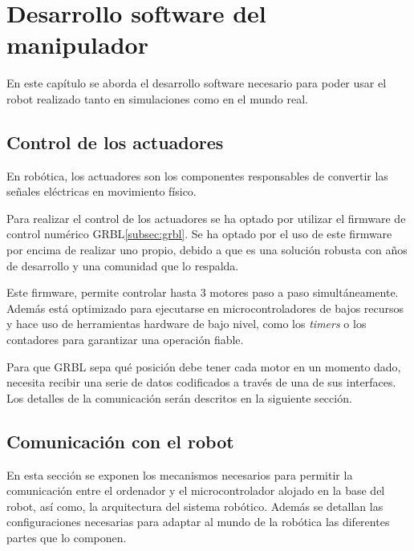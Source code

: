\chapter{Desarrollo software del manipulador}
\label{cap:capitulo6}

\vspace{1cm}
\noindent En este capítulo se aborda el desarrollo software necesario para poder usar el robot realizado 
tanto en simulaciones como en el mundo real.

\section{Control de los actuadores}

En robótica, los actuadores son los componentes responsables de convertir las señales eléctricas 
en movimiento físico.

Para realizar el control de los actuadores se ha optado por utilizar el firmware de control numérico 
GRBL\ref{subsec:grbl}. Se ha optado por el uso de este firmware por encima de realizar uno propio, 
debido a que es una solución robusta con años de desarrollo y una comunidad que lo respalda.

Este firmware, permite controlar hasta 3 motores paso a paso simultáneamente. Además está optimizado para ejecutarse en 
microcontroladores de bajos recursos y hace uso de herramientas hardware de bajo nivel, como los \textit{timers} o los 
contadores para garantizar una operación fiable.

Para que GRBL sepa qué posición debe tener cada motor en un momento dado, necesita recibir 
una serie de datos codificados a través de una de sus interfaces. Los detalles de la comunicación 
serán descritos en la siguiente sección.

\section{Comunicación con el robot}
En esta sección se exponen los mecanismos necesarios para permitir la comunicación entre el ordenador y 
el microcontrolador alojado en la base del robot, así como, la arquitectura del sistema robótico. Además se detallan las configuraciones necesarias 
para adaptar al mundo de la robótica las diferentes partes que lo componen.

